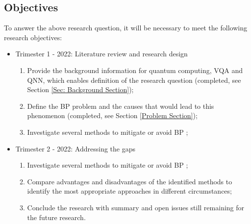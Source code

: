 \subsection{Objectives}
To answer the above research question, it will be necessary to meet the following research objectives:
\begin{itemize}
    \item Trimester 1 - 2022: Literature review and research design
          \begin{enumerate}
              \item Provide the background information for quantum computing, VQA and QNN, which enables definition of the research question (completed, see Section \ref{Sec: Background Section});
              \item Define the BP problem and the causes that would lead to this phenomenon \cite{wangNoiseinducedBarrenPlateaus2021,zhaoAnalyzingBarrenPlateau2021} (completed, see Section \ref{Problem Section});
              \item Investigate several methods to mitigate or avoid BP \cite{pesahAbsenceBarrenPlateaus2021, pattiEntanglementDevisedBarren2021,liuParameterInitializationMethod2021};
          \end{enumerate}
    \item Trimester 2 - 2022: Addressing the gaps
          \begin{enumerate}
              \item Investigate several methods to mitigate or avoid BP \cite{pesahAbsenceBarrenPlateaus2021, pattiEntanglementDevisedBarren2021,liuParameterInitializationMethod2021};
              \item Compare advantages and disadvantages of the identified methods to identify the most appropriate approaches in different circumstances;
              \item Conclude the research with summary and open issues still remaining for the future research.
          \end{enumerate}
\end{itemize}